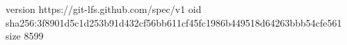 version https://git-lfs.github.com/spec/v1
oid sha256:3f8901d5c1d253b91d432cf56bb611cf45fc1986b449518d64263bbb54cfe561
size 8599

